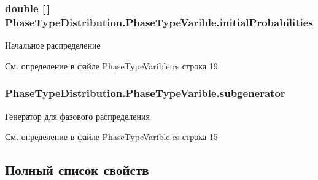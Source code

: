 \subsubsection[{\texorpdfstring{initial\+Probabilities}{initialProbabilities}}]{\setlength{\rightskip}{0pt plus 5cm}double \mbox{[}$\,$\mbox{]} Phase\+Type\+Distribution.\+Phase\+Type\+Varible.\+initial\+Probabilities\hspace{0.3cm}{\ttfamily [private]}}\hypertarget{class_phase_type_distribution_1_1_phase_type_varible_a7eeae4391793145247a5925c6e012907}{}\label{class_phase_type_distribution_1_1_phase_type_varible_a7eeae4391793145247a5925c6e012907}


Начальное распределение 



См. определение в файле Phase\+Type\+Varible.\+cs строка 19

\subsubsection[{\texorpdfstring{subgenerator}{subgenerator}}]{ Phase\+Type\+Distribution.\+Phase\+Type\+Varible.\+subgenerator\hspace{0.3cm}{\ttfamily [private]}}\hypertarget{class_phase_type_distribution_1_1_phase_type_varible_a22d6fd67935890ba294a0ed183d7cb7c}{}\label{class_phase_type_distribution_1_1_phase_type_varible_a22d6fd67935890ba294a0ed183d7cb7c}


Генератор для фазового распределения 



См. определение в файле Phase\+Type\+Varible.\+cs строка 15



\subsection{Полный список свойств}

